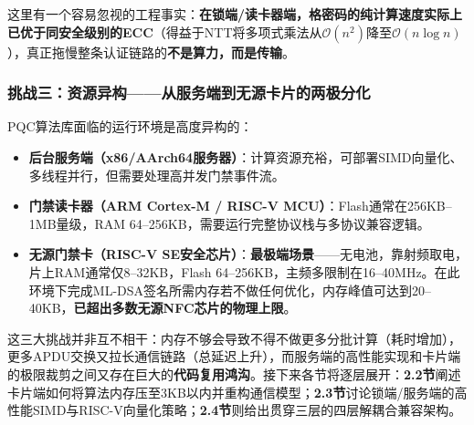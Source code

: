 这里有一个容易忽视的工程事实：\textbf{在锁端/读卡器端，格密码的纯计算速度实际上已优于同安全级别的ECC}（得益于NTT将多项式乘法从$\mathcal{O}(n^2)$降至$\mathcal{O}(n\log n)$），真正拖慢整条认证链路的\textbf{不是算力，而是传输}。

\subsubsection{挑战三：资源异构——从服务端到无源卡片的两极分化}

PQC算法库面临的运行环境是高度异构的：

\begin{itemize}
	\item \textbf{后台服务端（x86/AArch64服务器）}：计算资源充裕，可部署SIMD向量化、多线程并行，但需要处理高并发门禁事件流。
	\item \textbf{门禁读卡器（ARM Cortex-M / RISC-V MCU）}：Flash通常在256KB--1MB量级，RAM 64--256KB，需要运行完整协议栈与多协议兼容逻辑。
	\item \textbf{无源门禁卡（RISC-V SE安全芯片）}：\textbf{最极端场景}——无电池，靠射频取电，片上RAM通常仅8--32KB，Flash 64--256KB，主频多限制在16--40MHz。在此环境下完成ML-DSA签名所需内存若不做任何优化，内存峰值可达到20--40KB，\textbf{已超出多数无源NFC芯片的物理上限}。
\end{itemize}

这三大挑战并非互不相干：内存不够会导致不得不做更多分批计算（耗时增加），更多APDU交换又拉长通信链路（总延迟上升），而服务端的高性能实现和卡片端的极限裁剪之间又存在巨大的\textbf{代码复用鸿沟}。接下来各节将逐层展开：\textbf{2.2节}阐述卡片端如何将算法内存压至3KB以内并重构通信模型；\textbf{2.3节}讨论锁端/服务端的高性能SIMD与RISC-V向量化策略；\textbf{2.4节}则给出贯穿三层的四层解耦合兼容架构。

\endinput
